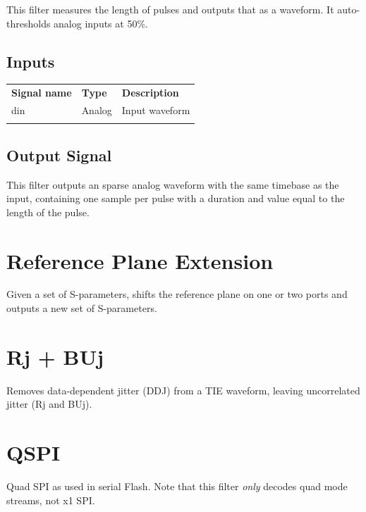 This filter measures the length of pulses and outputs that as a waveform. It auto-thresholds analog inputs at 50\%.

\subsection{Inputs}

\begin{tabularx}{16cm}{llX}
\thickhline
\textbf{Signal name} & \textbf{Type} & \textbf{Description} \\
\thickhline
din & Analog & Input waveform \\
\thickhline
\end{tabularx}

\subsection{Output Signal}

This filter outputs an sparse analog waveform with the same timebase as the input, containing one sample per pulse with
a duration and value equal to the length of the pulse.

\pagebreak
\section{Reference Plane Extension}

Given a set of S-parameters, shifts the reference plane on one or two ports and outputs a new set of S-parameters.

\pagebreak
\section{Rj + BUj}

Removes data-dependent jitter (DDJ) from a TIE waveform, leaving uncorrelated jitter (Rj and BUj).

\pagebreak
\section{QSPI}

Quad SPI as used in serial Flash. Note that this filter \emph{only} decodes quad mode streams, not x1 SPI.

